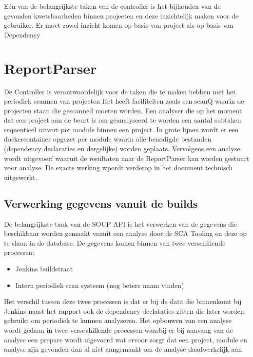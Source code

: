 Eén van de belangrijkste taken van de controller is het bijhouden van de gevonden kwetsbaarheden binnen projecten en deze inzichtelijk maken voor de gebruiker. Er moet zowel inzicht komen op basis van project als op basis van Dependency

\section{ReportParser}



De Controller is verantwoordelijk voor de taken die te maken hebben met het periodiek scannen van projecten Het heeft faciliteiten zoals een scanQ waarin de projecten staan die gescanned moeten worden. Een analyser die op het moment dat een project aan de beurt is om geanalyseerd te worden een aantal subtaken sequentieel uitvert per module binnen een project.
In grote lijnen wordt er een dockercontainer opgezet per module waarin alle benodigde bestanden (dependency declaraties en dergelijke) worden geplaats. Vervolgens een analyse wordt uitgevoerf waaruit de resultaten naar de ReportParser kan worden gestuurt voor analyse. De exacte werking wpordt verderop in het document technisch uitgewerkt.




\subsection{Verwerking gegevens vanuit de builds}\label{subsec:verwerking-gegevens-vanuit-de-sca}
De belangrijkste taak van de SOUP API is het verwerken van de gegevens die beschikbaar worden gemaakt vanuit een analyse door de SCA Tooling en deze op te slaan in de database. De gegevens komen binnen van twee verschillende processen:
\begin{itemize}
    \item Jenkins buildstraat
    \item Intern periodiek scan systeem (nog betere naam vinden)
\end{itemize}

Het verschil tussen deze twee processen is dat er bij de data die binnenkomt bij Jenkins naast het rapport ook de dependency declataties zitten die later worden gebruikt om periodiek te kunnen analyseren. Het opbouwen van een analyse wordt gedaan in twee verscvhillende processen waarbij er bij aanvang van de analyse een prepare wordt uigevoerd wat ervoor zorgt dat een project, module en analyse zijn gevonden dan al niet aangemaakt om de analyse daadwerkelijk aan



